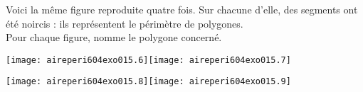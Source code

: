 Voici la même figure reproduite quatre fois. Sur chacune d'elle, des
segments ont été noircis : ils représentent le périmètre de
polygones.\\Pour chaque figure, nomme le polygone concerné.
\par
\texttt{[image: aireperi604exo015.6]}\hfill\texttt{[image: aireperi604exo015.7]}\par
\texttt{[image: aireperi604exo015.8]}\hfill\texttt{[image: aireperi604exo015.9]}
